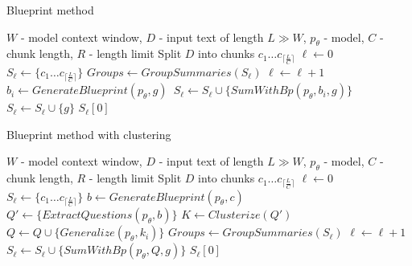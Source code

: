 \documentclass{superfri}
\begin{document}
\noindent
\begin{minipage}[t]{0.49\textwidth}
  \begin{algorithm}[H]
    \caption{Blueprint method}\label{alg:bl}
    \begin{algorithmic}
      \Require $W$ - model context window, $D$ - input text of length $L \gg W$, $p_\theta$ - model, $C$ - chunk length, $R$ - length limit
      \State Split $D$ into chunks $c_1\dots c_{\lceil \frac{L}{C} \rceil}$
      \State $\ell \gets 0$
      \State $S_\ell \gets \{c_1\dots c_{\lceil \frac{L}{C} \rceil}\}$
      \Repeat {}
        \State $Groups \gets GroupSummaries(S_\ell)$
        \State $\ell \gets \ell + 1$
            \State $b_i \gets GenerateBlueprint(p_\theta, g)$\
            \State $S_\ell \gets S_\ell \cup \{SumWithBp(p_\theta, b_i, g)\}$
          \Else
            \State $S_\ell \gets S_\ell \cup \{g\}$
          \EndIf
        \EndFor
      \State \Return $S_\ell[0]$
    \end{algorithmic}
  \end{algorithm}
\end{minipage}\hfill
\begin{minipage}[t]{0.49\textwidth}
  \begin{algorithm}[H]
  \caption{Blueprint method with clustering}\label{alg:bl_cl}
      \begin{algorithmic}
        \Require $W$ - model context window, $D$ - input text of length $L \gg W$, $p_\theta$ - model, $C$ - chunk length, $R$ - length limit
        \State Split $D$ into chunks $c_1\dots c_{\lceil \frac{L}{C} \rceil}$
        \State $\ell \gets 0$
        \State $S_\ell \gets \{c_1\dots c_{\lceil \frac{L}{C} \rceil}\}$
        \For{$c \in S_\ell$}
          \State $b \gets GenerateBlueprint(p_\theta, c)$
          \State $Q' \gets \{ExtractQuestions(p_\theta, b)\}$
        \EndFor
        \State $K \gets Clusterize(Q')$
          \State $Q  \gets Q \cup \{Generalize(p_\theta, k_i)\}$
        \EndFor
        \Repeat {}
        \State $Groups \gets GroupSummaries(S_\ell)$
        \State $\ell \gets \ell + 1$
          \State $S_\ell  \gets S_\ell \cup \{SumWithBp(p_\theta, Q, g)\}$
        \EndFor
      \State \Return $S_\ell[0]$
      \end{algorithmic}
  \end{algorithm}
\end{minipage}
\end{document}
